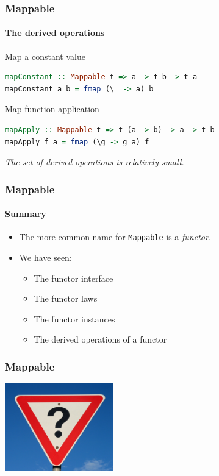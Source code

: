 \begin{frame}[fragile]
\frametitle{Mappable}
\framesubtitle{The derived operations}
\begin{block}{Map a constant value}
\begin{lstlisting}[style=language,language=haskell]
mapConstant :: Mappable t => a -> t b -> t a
mapConstant a b = fmap (\_ -> a) b
\end{lstlisting}
\end{block}
\begin{block}{Map function application}
\begin{lstlisting}[style=language,language=haskell]
mapApply :: Mappable t => t (a -> b) -> a -> t b
mapApply f a = fmap (\g -> g a) f
\end{lstlisting}
\end{block}
\emph{The set of derived operations is relatively small.}
\end{frame}

\begin{frame}[fragile]
\frametitle{Mappable}
\framesubtitle{Summary}
\begin{itemize}
\item The more common name for \lstinline{Mappable} is a \emph{functor}.
\item We have seen:
  \begin{itemize}
  \item The functor interface
  \item The functor laws
  \item The functor instances
  \item The derived operations of a functor
  \end{itemize}
\end{itemize}
\end{frame}

\begin{frame}[fragile]
\frametitle{Mappable}
\begin{center}
\includegraphics[height=3.8cm]{image/Question_mark_road_sign,_Australia.jpg}
\end{center}
\end{frame}